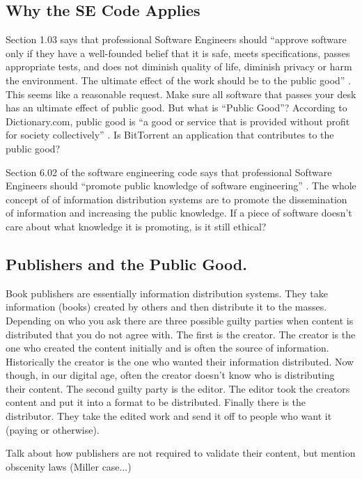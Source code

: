 \documentclass[11pt]{article}
\begin{document}
\subsection{Why the SE Code Applies}

Section 1.03 says that professional Software Engineers should ``approve software only if they have a well-founded belief that it is safe, meets specifications, passes appropriate tests, and does not diminish quality of life, diminish privacy or harm the environment. The ultimate effect of the work should be to the public good'' \cite[1.03]{secode}. This seems like a reasonable request. Make sure all software that passes your desk has an ultimate effect of public good. But what is ``Public Good''? According to Dictionary.com, public good is ``a good or service that is provided without profit for society collectively'' \cite{pubgooddef}. Is BitTorrent an application that contributes to the public good?

Section 6.02 of the software engineering code says that professional Software Engineers should ``promote public knowledge of software engineering'' \cite[6.02]{secode}. The whole concept of of information distribution systems are to promote the dissemination of information and increasing the public knowledge. If a piece of software doesn't care about what knowledge it is promoting, is it still ethical?

\subsection{Publishers and the Public Good.}

Book publishers are essentially information distribution systems. They take information (books) created by others and then distribute it to the masses. Depending on who you ask there are three possible guilty parties when content is distributed that you do not agree with. The first is the creator. The creator is the one who created the content initially and is often the source of information. Historically the creator is the one who wanted their information distributed. Now though, in our digital age, often the creator doesn't know who is distributing their content. The second guilty party is the editor. The editor took the creators content and put it into a format to be distributed. Finally there is the distributor. They take the edited work and send it off to people who want it (paying or otherwise).

Talk about how publishers are not required to validate their content, but mention obscenity laws (Miller case...)
\end{document}
